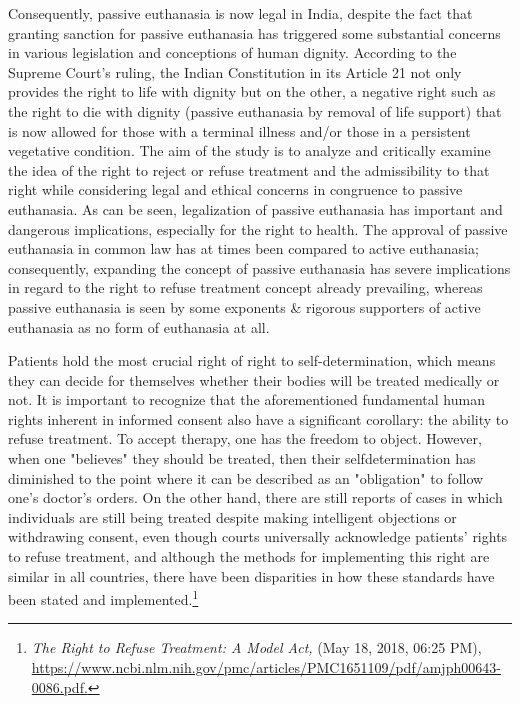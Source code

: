 \begin{multicols}{2}
\noi
Consequently, passive euthanasia is now legal in India, despite the fact that granting sanction
for passive euthanasia has triggered some substantial concerns in various legislation and
conceptions of human dignity. According to the Supreme Court's ruling, the Indian
Constitution in its Article 21 not only provides the right to life with dignity but on the other, a
negative right such as the right to die with dignity (passive euthanasia by removal of life
support) that is now allowed for those with a terminal illness and/or those in a persistent
vegetative condition. The aim of the study is to analyze and critically examine the idea of the
right to reject or refuse treatment and the admissibility to that right while considering legal
and ethical concerns in congruence to passive euthanasia. As can be seen, legalization of
passive euthanasia has important and dangerous implications, especially for the right to
health. The approval of passive euthanasia in common law has at times been compared to
active euthanasia; consequently, expanding the concept of passive euthanasia has severe
implications in regard to the right to refuse treatment concept already prevailing, whereas
passive euthanasia is seen by some exponents \& rigorous supporters of active euthanasia as
no form of euthanasia at all.

\noi
Patients hold the most crucial right of right to self-determination, which means they can
decide for themselves whether their bodies will be treated medically or not. It is important to
recognize that the aforementioned fundamental human rights inherent in informed consent
also have a significant corollary: the ability to refuse treatment. To accept therapy, one has
the freedom to object. However, when one "believes" they should be treated, then their selfdetermination has diminished to the point where it can be described as an "obligation" to
follow one's doctor's orders. On the other hand, there are still reports of cases in which
individuals are still being treated despite making intelligent objections or withdrawing
consent, even though courts universally acknowledge patients' rights to refuse treatment, and
although the methods for implementing this right are similar in all countries, there have been
disparities in how these standards have been stated and implemented.\footnote{\textit{The Right to Refuse Treatment: A Model Act,} (May 18, 2018, 06:25 PM), \url{https://www.ncbi.nlm.nih.gov/pmc/articles/PMC1651109/pdf/amjph00643-0086.pdf.}}


\end{multicols}
